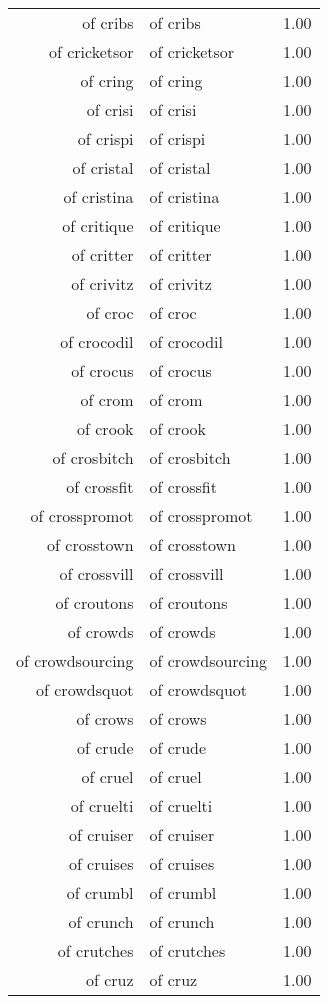 \begin{table}[ht]
\begin{tabular}{rlr}
  of cribs & of cribs & 1.00 \\ 
  of cricketsor & of cricketsor & 1.00 \\ 
  of cring & of cring & 1.00 \\ 
  of crisi & of crisi & 1.00 \\ 
  of crispi & of crispi & 1.00 \\ 
  of cristal & of cristal & 1.00 \\ 
  of cristina & of cristina & 1.00 \\ 
  of critique & of critique & 1.00 \\ 
  of critter & of critter & 1.00 \\ 
  of crivitz & of crivitz & 1.00 \\ 
  of croc & of croc & 1.00 \\ 
  of crocodil & of crocodil & 1.00 \\ 
  of crocus & of crocus & 1.00 \\ 
  of crom & of crom & 1.00 \\ 
  of crook & of crook & 1.00 \\ 
  of crosbitch & of crosbitch & 1.00 \\ 
  of crossfit & of crossfit & 1.00 \\ 
  of crosspromot & of crosspromot & 1.00 \\ 
  of crosstown & of crosstown & 1.00 \\ 
  of crossvill & of crossvill & 1.00 \\ 
  of croutons & of croutons & 1.00 \\ 
  of crowds & of crowds & 1.00 \\ 
  of crowdsourcing & of crowdsourcing & 1.00 \\ 
  of crowdsquot & of crowdsquot & 1.00 \\ 
  of crows & of crows & 1.00 \\ 
  of crude & of crude & 1.00 \\ 
  of cruel & of cruel & 1.00 \\ 
  of cruelti & of cruelti & 1.00 \\ 
  of cruiser & of cruiser & 1.00 \\ 
  of cruises & of cruises & 1.00 \\ 
  of crumbl & of crumbl & 1.00 \\ 
  of crunch & of crunch & 1.00 \\ 
  of crutches & of crutches & 1.00 \\ 
  of cruz & of cruz & 1.00 \\ 

\end{tabular}
\end{table}
